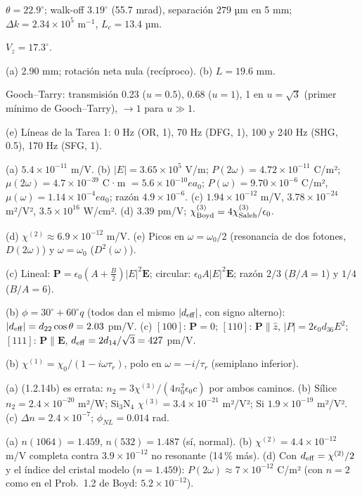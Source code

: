 \documentclass[10pt]{article}
\begin{document}
{\begin{description}[leftmargin=1.2em,itemsep=2pt]
\item[24.] $\theta=22.9^\circ$; walk-off $3.19^\circ$ (55.7 mrad), separación $279$ µm en 5 mm; $\Delta k=2.34\times10^5$ m$^{-1}$, $L_c=13.4$ µm.
\item[25.] $V_z=17.3^\circ$.
\item[26.] (a) 2.90 mm; rotación neta nula (recíproco). (b) $L=19.6$ mm.
\item[27.] Gooch–Tarry: transmisión 0.23 ($u=0.5$), 0.68 ($u=1$), 1 en $u=\sqrt3$ (primer mínimo de Gooch–Tarry), $\to1$ para $u\gg1$.
\item[28.] (e) Líneas de la Tarea 1: 0 Hz (OR, 1), 70 Hz (DFG, 1), 100 y 240 Hz (SHG, 0.5), 170 Hz (SFG, 1).
\item[29.] (a) $5.4\times10^{-11}$ m/V. (b) $|E|=3.65\times10^5$ V/m; $P(2\omega)=4.72\times10^{-11}$ C/m²; $\mu(2\omega)=4.7\times10^{-39}$ C·m $=5.6\times10^{-10}ea_0$; $P(\omega)=9.70\times10^{-6}$ C/m², $\mu(\omega)=1.14\times10^{-4}ea_0$; razón $4.9\times10^{-6}$. (c) $1.94\times10^{-12}$ m/V, $3.78\times10^{-24}$ m²/V², $3.5\times10^{16}$ W/cm². (d) $3.39$ pm/V; $\chi^{(3)}_{\rm Boyd}=4\chi^{(3)}_{\rm Saleh}/\epsilon_0$.
\item[30.] (d) $\chi^{(2)}\approx6.9\times10^{-12}$ m/V. (e) Picos en $\omega=\omega_0/2$ (resonancia de dos fotones, $D(2\omega)$) y $\omega=\omega_0$ ($D^2(\omega)$).
\item[33.] (c) Lineal: $\mathbf P=\epsilon_0(A+\frac B2)|E|^2\mathbf E$; circular: $\epsilon_0A|E|^2\mathbf E$; razón $2/3$ ($B/A=1$) y $1/4$ ($B/A=6$).
\item[35.] (b) $\phi=30^\circ+60^\circ q$ (todos dan el mismo $|d_{\rm eff}|$, con signo alterno): $|d_{\rm eff}|=d_{22}\cos\theta=2.03$ pm/V. (c) $[100]$: $\mathbf P=0$; $[110]$: $\mathbf P\parallel\hat z$, $|P|=2\epsilon_0d_{36}E^2$; $[111]$: $\mathbf P\parallel\mathbf E$, $d_{\rm eff}=2d_{14}/\sqrt3=427$ pm/V.
\item[37.] (b) $\chi^{(1)}=\chi_0/(1-i\omega\tau_r)$, polo en $\omega=-i/\tau_r$ (semiplano inferior).
\item[38.] (a) (1.2.14b) es errata: $n_2=3\chi^{(3)}/(4n_0^2\epsilon_0c)$ por ambos caminos. (b) Sílice $n_2=2.4\times10^{-20}$ m²/W; Si$_3$N$_4$ $\chi^{(3)}=3.4\times10^{-21}$ m²/V²; Si $1.9\times10^{-19}$ m²/V². (c) $\Delta n=2.4\times10^{-7}$; $\phi_{NL}=0.014$ rad.
\item[39.] (a) $n(1064)=1.459$, $n(532)=1.487$ (sí, normal). (b) $\chi^{(2)}=4.4\times10^{-12}$ m/V completa contra $3.9\times10^{-12}$ no resonante (14\,\% más). (d) Con $d_{\rm eff}=\chi^{(2)}/2$ y el índice del cristal modelo ($n=1.459$): $P(2\omega)\approx7\times10^{-12}$ C/m² (con $n=2$ como en el Prob.~1.2 de Boyd: $5.2\times10^{-12}$).
\end{description}
}
\end{document}
